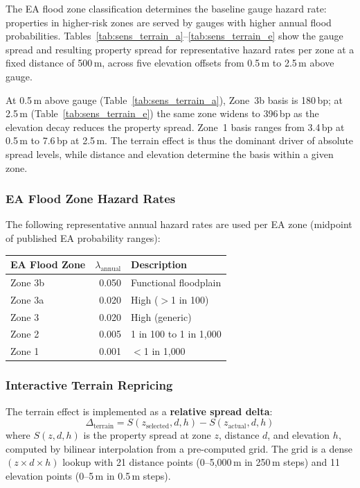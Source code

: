 \documentclass[11pt,a4paper]{article}
\begin{document}
The EA flood zone classification determines the baseline gauge hazard rate: properties
in higher-risk zones are served by gauges with higher annual flood probabilities.
Tables~\ref{tab:sens_terrain_a}--\ref{tab:sens_terrain_e} show the gauge spread and
resulting property spread for representative hazard rates per zone at a fixed distance
of 500\,m, across five elevation offsets from 0.5\,m to 2.5\,m above gauge.

At 0.5\,m above gauge (Table~\ref{tab:sens_terrain_a}), Zone~3b basis is 180\,bp;
at 2.5\,m (Table~\ref{tab:sens_terrain_e}) the same zone widens to 396\,bp as the
elevation decay reduces the property spread. Zone~1 basis ranges from 3.4\,bp at
0.5\,m to 7.6\,bp at 2.5\,m. The terrain effect is thus the dominant driver of
absolute spread levels, while distance and elevation determine the basis within a
given zone.

\subsubsection{EA Flood Zone Hazard Rates}

The following representative annual hazard rates are used per EA zone (midpoint of
published EA probability ranges):

\begin{center}
\begin{tabular}{lrl}
\toprule
\textbf{EA Flood Zone} & \textbf{$\lambda_{\text{annual}}$} & \textbf{Description} \\
\midrule
Zone 3b & 0.050 & Functional floodplain \\
Zone 3a & 0.020 & High ($>$1 in 100) \\
Zone 3  & 0.020 & High (generic) \\
Zone 2  & 0.005 & 1 in 100 to 1 in 1{,}000 \\
Zone 1  & 0.001 & $<$1 in 1{,}000 \\
\bottomrule
\end{tabular}
\end{center}

\subsubsection{Interactive Terrain Repricing}

The terrain effect is implemented as a \textbf{relative spread delta}:
\begin{equation}
    \Delta_{\text{terrain}} = S(z_{\text{selected}}, d, h) - S(z_{\text{actual}}, d, h)
    \label{eq:terrain_delta}
\end{equation}
where $S(z, d, h)$ is the property spread at zone $z$, distance $d$, and elevation
$h$, computed by bilinear interpolation from a pre-computed grid. The grid is a dense
$(z \times d \times h)$ lookup with 21 distance points (0--5{,}000\,m in 250\,m steps)
and 11 elevation points (0--5\,m in 0.5\,m steps).
\end{document}
